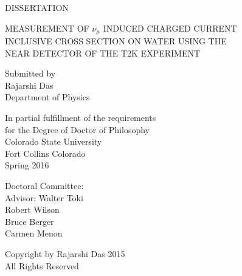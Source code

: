 \thispagestyle{empty}
\begin{center}
DISSERTATION\\

\bigskip
\bigskip
\bigskip
\bigskip
\bigskip

MEASUREMENT OF $\nu_\mu$ INDUCED CHARGED CURRENT\\ 
INCLUSIVE CROSS SECTION ON WATER USING THE\\
NEAR DETECTOR OF THE T2K EXPERIMENT\\

\bigskip
\bigskip
\bigskip
\bigskip
\bigskip

Submitted by\\
Rajarshi Das\\
Department of Physics\\

\bigskip
\bigskip
\bigskip
\bigskip
\bigskip

In partial fulfillment of the requirements\\
for the Degree of Doctor of Philosophy\\
Colorado State University\\
Fort Collins Colorado\\
Spring 2016
\end{center}

\bigskip
\bigskip
\bigskip
\bigskip

\singlespacing
\noindent Doctoral Committee:\\

\indent Advisor: Walter Toki\\

\indent Robert Wilson\\
\indent Bruce Berger\\
\indent Carmen Menon\\


\newpage

\thispagestyle{empty}
\vspace*{\fill}
\doublespacing
\begin{center}
Copyright by Rajarshi Das 2015\\
All Rights Reserved
\end{center}
\vspace*{\fill}

\newpage
{}


